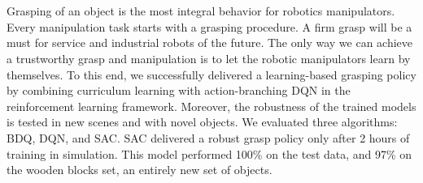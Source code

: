 \chapter{\abstractname}


Grasping of an object is the most integral behavior for robotics manipulators. Every manipulation task starts with a grasping procedure. A firm grasp will be a must for service and industrial robots of the future. The only way we can achieve a trustworthy grasp and manipulation is to let the robotic manipulators learn by themselves. To this end, we successfully delivered a learning-based grasping policy by combining curriculum learning with action-branching DQN in the reinforcement learning framework.
Moreover, the robustness of the trained models is tested in new scenes and with novel objects. We evaluated three algorithms: BDQ, DQN, and SAC. SAC delivered a robust grasp policy only after 2 hours of training in simulation. This model performed 100\% on the test data, and 97\% on the wooden blocks set, an entirely new set of objects.



\makeatletter
{}
{\renewcommand{\abstractname}{Kurzfassung}}
{\renewcommand{\abstractname}{Abstract}}
\makeatother

\chapter{\abstractname}

\begin{otherlanguage}{ngerman} %

\end{otherlanguage}


\makeatletter
{}
{\renewcommand{\abstractname}{Abstract}}
{\renewcommand{\abstractname}{Kurzfassung}}
\makeatother